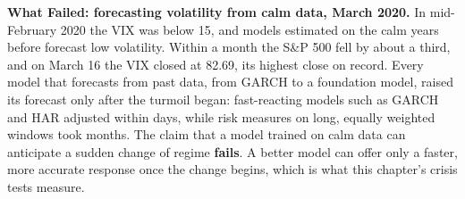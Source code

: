 \begin{callout}
\textbf{What Failed: forecasting volatility from calm data, March 2020.} In mid-February 2020 the VIX was below 15, and models estimated on the calm years before forecast low volatility. Within a month the S\&P 500 fell by about a third, and on March 16 the VIX closed at 82.69, its highest close on record. Every model that forecasts from past data, from GARCH to a foundation model, raised its forecast only after the turmoil began: fast-reacting models such as GARCH and HAR adjusted within days, while risk measures on long, equally weighted windows took months. The claim that a model trained on calm data can anticipate a sudden change of regime \textbf{fails}. A better model can offer only a faster, more accurate response once the change begins, which is what this chapter's crisis tests measure.
\end{callout}
